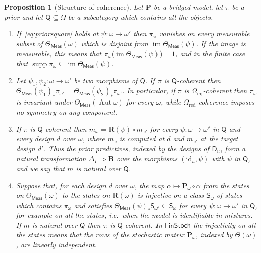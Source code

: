 \documentclass[11pt,a4paper]{article}
\theoremstyle{plain}
\newtheorem{proposition}[theorem]{Proposition}
\theoremstyle{definition}
\theoremstyle{remark}
\newcommand{\cat}[1]{\mathsf{#1}}
\newcommand{\catO}{\cat{\Omega}}
\newcommand{\catD}{\cat{D}}
\newcommand{\Meas}{\cat{Meas}}
\newcommand{\FinStoch}{\cat{FinStoch}}
\newcommand{\id}{\mathrm{id}}
\begin{document}
\begin{proposition}[Structure of coherence]\label{prop:coherence}
Let $\mathbf P$ be a bridged model, let $\pi$ be a prior and let
$\cat{Q} \subseteq \catO$ be a subcategory which contains all the objects.
\begin{enumerate}
\item If~\eqref{eq:priorsquare} holds at $\psi \colon \omega \to \omega'$ then
$\pi_{\omega}$ vanishes on every measurable subset of $\Theta_\Meas(\omega)$
which is disjoint from $\operatorname{im}\Theta_\Meas(\psi)$. If the image is
measurable, this means that
$\pi_{\omega}\bigl(\operatorname{im}\Theta_\Meas(\psi)\bigr) = 1$, and in the
finite case that
$\operatorname{supp}\pi_{\omega} \subseteq \operatorname{im}\Theta_\Meas(\psi)$.
\item Let $\psi_1,\psi_2 \colon \omega \to \omega'$ be two morphisms of
$\cat{Q}$. If $\pi$ is $\cat{Q}$-coherent then
$\Theta_\Meas(\psi_1)_{*}\pi_{\omega'} = \Theta_\Meas(\psi_2)_{*}\pi_{\omega'}$.
In particular, if $\pi$ is $\catO_{\mathrm{inj}}$-coherent then $\pi_{\omega}$
is invariant under $\Theta_\Meas(\operatorname{Aut}\omega)$ for every
$\omega$, while $\catO_{\mathrm{red}}$-coherence imposes no symmetry on any
component.
\item If $\pi$ is $\cat{Q}$-coherent then
$m_{\omega} = \mathbf{R}(\psi)\circ m_{\omega'}$ for every
$\psi \colon \omega \to \omega'$ in $\cat{Q}$ and every design $d$ over
$\omega$, where $m_{\omega}$ is computed at $d$ and $m_{\omega'}$ at the
target design $d'$. Thus the prior predictives, indexed by the designs of
$\catD_{u}$, form a natural transformation $\Delta_{I} \Rightarrow \mathbf{R}$
over the morphisms $(\id_{u},\psi)$ with $\psi$ in $\cat{Q}$, and we say
that $m$ is \emph{natural over} $\cat{Q}$.
\item Suppose that, for each design $d$ over $\omega$, the map
$\alpha \mapsto \mathbf P_{\omega}\circ\alpha$ from the states on
$\Theta_\Meas(\omega)$ to the states on $\mathbf{R}(\omega)$ is injective on
a class $\cat{S}_{\omega}$ of states which contains $\pi_{\omega}$ and
satisfies $\Theta_\Meas(\psi)_{*}\cat{S}_{\omega'} \subseteq \cat{S}_{\omega}$
for every $\psi \colon \omega \to \omega'$ in $\cat{Q}$, for example on all
the states, i.e.\ when the model is identifiable in mixtures. If $m$ is
natural over $\cat{Q}$ then $\pi$ is $\cat{Q}$-coherent. In $\FinStoch$ the
injectivity on all the states means that the rows of the stochastic matrix
$\mathbf P_{\omega}$, indexed by $\Theta(\omega)$, are linearly independent.
\end{enumerate}
\end{proposition}
\end{document}
